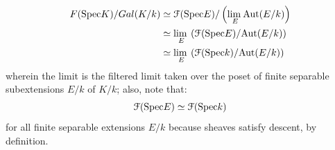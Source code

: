 \begin{corollary}
                    $$
                        \begin{aligned}
                            F(\mathrm{Spec} K)/Gal(K/k) & \simeq \mathcal{F}(\mathrm{Spec} E)/\left(\underset{E}{\operatorname{lim} \:} \mathrm{Aut}(E/k)\right)
                            \\
                            & \simeq \underset{E}{\operatorname{lim} \:} \left(\mathcal{F}(\mathrm{Spec} E)/\mathrm{Aut}(E/k)\right)
                            \\
                            & \simeq \underset{E}{\operatorname{lim} \:} \left(\mathcal{F}(\mathrm{Spec} k)/\mathrm{Aut}(E/k)\right)
                        \end{aligned}
                    $$
                wherein the limit is the filtered limit taken over the poset of finite separable subextensions $E/k$ of $K/k$; also, note that:
                    $$\mathcal{F}(\mathrm{Spec} E) \simeq \mathcal{F}(\mathrm{Spec} k)$$
                for all finite separable extensions $E/k$ because sheaves satisfy descent, by definition.
            \end{corollary}

